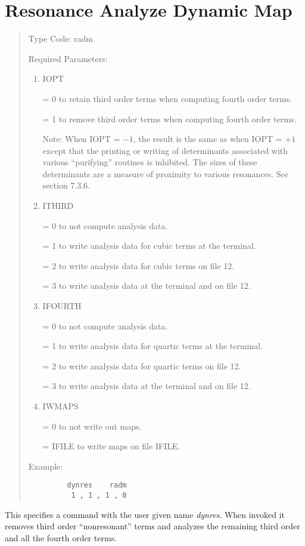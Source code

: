 \section{Resonance Analyze Dynamic Map}
\begin{quotation}
\noindent     Type Code:  radm
\vspace{5mm}

\noindent Required Parameters:
\begin{enumerate}
      \item  IOPT

             = 0 to retain third order terms when computing fourth order terms.

             = 1 to remove third order terms when computing fourth order terms.

             Note:  When IOPT = $-1$, the result is the same as when IOPT =
             $+1$ except that the printing or writing of determinants
             associated with various ``purifying'' routines is inhibited.
             The sizes of these determinants are a measure of proximity to
             various resonances.  See section 7.3.6.

      \item  ITHIRD

             = 0 to not compute analysis data.

             = 1 to write analysis data for cubic terms at the terminal.

             = 2 to write analysis data for cubic terms on file 12.

             = 3 to write analysis data at the terminal and on file 12.

      \item  IFOURTH

             = 0 to not compute analysis data.

             = 1 to write analysis data for quartic terms at the terminal.

             = 2 to write analysis data for quartic terms on file 12.

             = 3 to write analysis data at the terminal and on file 12.

      \item  IWMAPS

             = 0 to not write out maps.

             = IFILE to write maps on file IFILE.
\end{enumerate}

\vspace{5mm}
\noindent Example:
\begin{verbatim}
         dynres    radm
          1 , 1 , 1 , 0
\end{verbatim}
\end{quotation}
This specifies a command with the user given name {\em dynres}.  When invoked it removes third order ``nonresonant'' terms and analyzes the remaining third order and all the fourth order terms.

